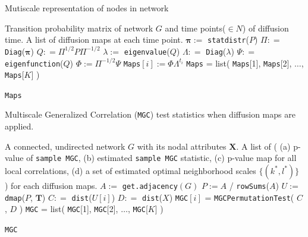 \documentclass[12pt]{article}
\theoremstyle{definition}
\begin{document}
\begin{algorithm}[H]
	\caption{Mutiscale representation of nodes in network}
	\begin{algorithmic}[1]
		\Require Transition probability matrix of network $G$ and time points($\in N$) of diffusion time. 
		\Ensure A list of diffusion maps at each time point.
		\State $\mathbf{\pi} :=$ \texttt{statdistr}($P$) 
		\State $\Pi : =$ \texttt{Diag}($\mathbf{\pi}$)
		\State $Q: = \Pi^{1/2} P \Pi^{-1/2}$ 
		\State $\lambda := $ \texttt{eigenvalue}($Q$)
		\State $\Lambda : =$ \texttt{Diag}($\lambda$)
		\State $\Psi : =$ \texttt{eigenfunction}($Q$) 
		\State $\Phi :=  \Pi^{-1/2} \Psi$
		\Begin
		\State \texttt{Maps}$[i] := \Phi \Lambda^{t_{i}}$  
		\End
		\EndFor
		\State \texttt{Maps} = list( \texttt{Maps}[1], \texttt{Maps}[2], $\ldots$, \texttt{Maps}[$K$]  )
		
		\Return \texttt{Maps}
		\EndFunction
	\end{algorithmic}
\end{algorithm}

\begin{algorithm}[H]
	\caption{Multiscale Generalized Correlation (\texttt{MGC}) test statistics when diffusion maps are applied.}
	\begin{algorithmic}[1]
		\Require A connected, undirected network $G$ with its nodal attributes $\mathbf{X}$.
		\Ensure A list of \big(  (a) p-value of \texttt{sample MGC}, (b) estimated \texttt{sample MGC} statistic, (c) p-value map for all local correlations, (d) a set of estimated optimal neighborhood scales $\{  (k^{*}, l^{*}  ) \}$  \big) for each diffusion maps.
		\State $A :=$ \texttt{get.adjacency}$(G)$
		\State $P := A $ / \texttt{rowSums}($A$) 
		\State $U :=$ \texttt{dmap}($P$, $\mathbf{T}$) 
		\Begin
		\State $C : =$  \texttt{dist}($U[i]$) 
		\State $D : =$ \texttt{dist}($X$) 
		\State \texttt{MGC}$[i]$ = \texttt{MGCPermutationTest}( $C$, $D$ ) 
		\End
		\EndFor
		\State \texttt{MGC} = list( \texttt{MGC}[1], \texttt{MGC}[2], $\ldots$, \texttt{MGC}[$K$]  )
		
		\Return \texttt{MGC}
		\EndFunction
	\end{algorithmic}
\end{algorithm}
\end{document}
